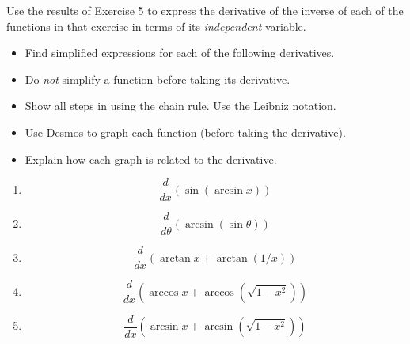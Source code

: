 \documentclass{ximera}
\begin{document}
\begin{exercise} \label{E898gbfgg}
Use the results of Exercise 5 to express the derivative of the inverse of each of the functions in that exercise in terms of its \emph{independent} variable.
\end{exercise}

\begin{exercise}  \label{Ehglkhfgjsdafn}
\begin{itemize}
\item Find simplified expressions for each of the following derivatives. 

\item Do \emph{not} simplify a function before taking its derivative. 

\item Show all steps in using the chain rule. Use the Leibniz notation. 

\item Use Desmos to graph each function (before taking the derivative).

\item Explain how each graph is related to the derivative. 

\end{itemize}

\begin{enumerate}
\item
\[
       \frac{d}{dx}\left( \sin(\arcsin x ) \right)
\]

\item 
\[
       \frac{d}{d\theta}\left( \arcsin(\sin \theta ) \right)
\]

\item 
\[
  \frac{d}{dx}\left( \arctan x + \arctan(1/x)  \right)
\]

\item
\[
    \frac{d}{dx}\left( \arccos x + \arccos\left(\sqrt{1-x^2}\right)  \right)
\] 

\item
\[
    \frac{d}{dx}\left( \arcsin x + \arcsin\left(\sqrt{1-x^2}\right)  \right)
\] 
\end{enumerate}

\end{exercise}
\end{document}

